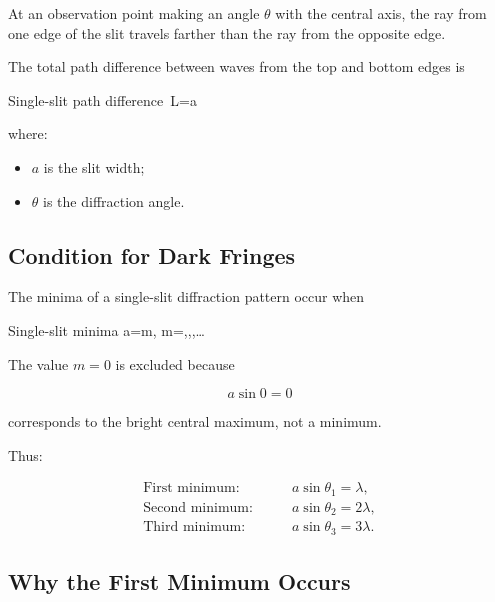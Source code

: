 \documentclass{studentnotes}
\begin{document}
At an observation point making an angle \(\theta\) with the central axis, the ray from one edge of the slit travels farther than the ray from the opposite edge.

\begin{center}
    \fbox{\rule{0.8\textwidth}{0.4\textwidth}}
\end{center}

The total path difference between waves from the top and bottom edges is

\begin{namedformula}{Single-slit path difference}
    \Delta\,L=a\sin\theta%
\end{namedformula}

where:

\begin{itemize}
    \item \(a\) is the slit width;
    \item \(\theta\) is the diffraction angle.
\end{itemize}

\subsection{Condition for Dark Fringes}

The minima of a single-slit diffraction pattern occur when

\begin{namedformula}{Single-slit minima}
    a\sin\theta=m\lambda,
    \qquad
    m=,,,\ldots
\end{namedformula}

The value \(m=0\) is excluded because

\[
    a\sin 0=0
\]

corresponds to the bright central maximum, not a minimum.

Thus:

\[
    \begin{aligned}
        \text{First minimum:}\qquad  & a\sin\theta_1=\lambda,  \\
        \text{Second minimum:}\qquad & a\sin\theta_2=2\lambda, \\
        \text{Third minimum:}\qquad  & a\sin\theta_3=3\lambda.
    \end{aligned}
\]

\subsection{Why the First Minimum Occurs}
\end{document}

